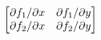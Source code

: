 \documentclass[preview]{standalone}
\begin{document}
\begin{align*}
\begin{bmatrix}\small{\partial f_1 / \partial x} & \small{\partial f_1 / \partial y}\\ \small{\partial f_2 / \partial x} & \small{\partial f_2 / \partial y} \end{bmatrix}
\end{align*}
\end{document}
